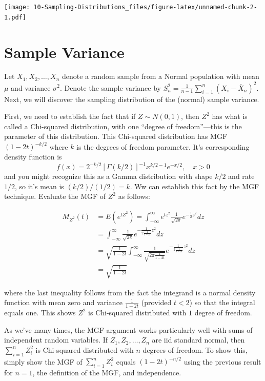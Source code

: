 \documentclass[]{book}
\begin{document}
\texttt{[image: 10-Sampling-Distributions\_files/figure-latex/unnamed-chunk-2-1.pdf]}

\section{Sample Variance}\label{sample-variance}

Let \(X_1, X_2, \ldots, X_n\) denote a random sample from a Normal
population with mean \(\mu\) and variance \(\sigma^2\). Denote the
sample variance by
\(S^2_n = \frac{1}{n-1}\sum_{i=1}^n (X_i - \overline X_n)^2\). Next, we
will discover the sampling distribution of the (normal) sample variance.

First, we need to establish the fact that if \(Z\sim N(0,1)\), then
\(Z^2\) has what is called a Chi-squared distribution, with one ``degree
of freedom''---this is the parameter of this distribution. This
Chi-squared distribution has MGF \(\left(1-2t\right)^{-k/2}\) where
\(k\) is the degrees of freedom parameter. It's corresponding density
function is
\[f(x) = 2^{-k/2}\left[\Gamma(k/2)\right]^{-1}x^{k/2-1}e^{-x/2},\quad x>0\]
and you might recognize this as a Gamma distribution with shape \(k/2\)
and rate \(1/2\), so it's mean is \((k/2)/(1/2) = k\). Ww can establish
this fact by the MGF technique. Evaluate the MGF of \(Z^2\) as follows:

\begin{align*}
M_{Z^2}(t) &= E(e^{tZ^2}) = \int_{-\infty}^{\infty} e^{tz^2}\frac{1}{\sqrt{2\pi}}e^{-\tfrac12 z^2}dz\\
& = \int_{-\infty}^{\infty} \frac{1}{\sqrt{2\pi}} e^{-\frac{1}{2\frac{1}{1-2t}}z^2}dz\\
& = \sqrt{\frac{1}{1-2t}}\int_{-\infty}^{\infty} \frac{1}{\sqrt{2\pi\frac{1}{1-2t}}} e^{-\frac{1}{2\frac{1}{1-2t}}z^2}dz\\
& = \sqrt{\frac{1}{1-2t}}
\end{align*}

where the last inequality follows from the fact the integrand is a
normal density function with mean zero and variance \(\frac{1}{1-2t}\)
(provided \(t<2\)) so that the integral equals one. This shows \(Z^2\)
is Chi-squared distributed with \(1\) degree of freedom.

As we've many times, the MGF argument works particularly well with sums
of independent random variables. If \(Z_1, Z_2, \ldots, Z_n\) are iid
standard normal, then \(\sum_{i=1}^n Z_i^2\) is Chi-squared distributed
with \(n\) degrees of freedom. To show this, simply show the MGF of
\(\sum_{i=1}^n Z_i^2\) equals \(\left(1-2t\right)^{-n/2}\) using the
previous result for \(n=1\), the definition of the MGF, and
independence.
\end{document}
